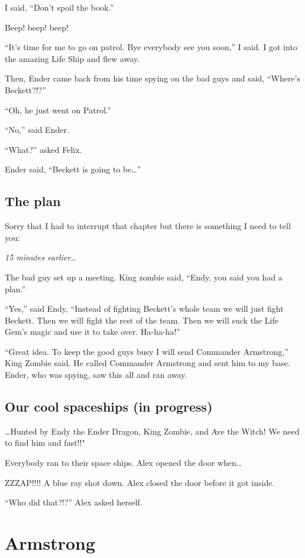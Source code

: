 \documentclass[letterpaper, oneside, 12pt]{krantz}
\begin{document}
I said, ``Don't spoil the book.''

Beep! beep! beep!

``It's time for me to go on patrol. Bye everybody see you soon,'' I
said. I got into the amazing Life Ship and flew away.

Then, Ender came back from his time spying on the bad guys and said,
``Where's Beckett?!?''

``Oh, he just went on Patrol.''

``No,'' said Ender.

``What?'' asked Felix.

Ender said, ``Beckett is going to be\ldots{}''

\hypertarget{the-plan}{%
\subsection{The plan}\label{the-plan}}

Sorry that I had to interrupt that chapter but there is something I need
to tell you:

\emph{15 minutes earlier\ldots{}}

The bad guy set up a meeting. King zombie said, ``Endy, you said you had
a plan.''

``Yes,'' said Endy, ``Instead of fighting Beckett's whole team we will
just fight Beckett. Then we will fight the rest of the team. Then we
will suck the Life Gem's magic and use it to take over. Ha-ha-ha!''

``Great idea. To keep the good guys busy I will send Commander
Armstrong,'' King Zombie said. He called Commander Armstrong and sent
him to my base. Ender, who was spying, saw this all and ran away.

\hypertarget{our-cool-spaceships-in-progress}{%
\subsection{Our cool spaceships (in
progress)}\label{our-cool-spaceships-in-progress}}

\ldots{}Hunted by Endy the Ender Dragon, King Zombie, and Ave the Witch!
We need to find him and fast!!"

Everybody ran to their space ships. Alex opened the door when\ldots{}

ZZZAP!!!! A blue ray shot down. Alex closed the door before it got
inside.

``Who did that?!?'' Alex asked herself.

\hypertarget{armstrong}{%
\section{Armstrong}\label{armstrong}}
\end{document}
